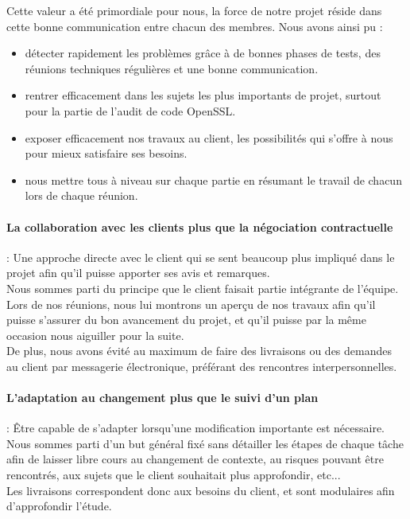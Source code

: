 Cette valeur a été primordiale pour nous, la force de notre projet réside dans cette bonne communication entre chacun des membres. Nous avons ainsi pu :
\begin{itemize}
\item détecter rapidement les problèmes grâce à de bonnes phases de tests, des réunions techniques régulières et une bonne communication.
\item rentrer efficacement dans les sujets les plus importants de projet, surtout pour la partie de l'audit de code OpenSSL.
\item exposer efficacement nos travaux au client, les possibilités qui s'offre à nous pour mieux satisfaire ses besoins.
\item nous mettre tous à niveau sur chaque partie en résumant le travail de chacun lors de chaque réunion.
\end{itemize}

\paragraph{La collaboration avec les clients plus que la négociation contractuelle} : Une approche directe avec le client qui se sent beaucoup plus impliqué dans le projet afin qu'il puisse apporter ses avis et remarques.\\

Nous sommes parti du principe que le client faisait partie intégrante de l'équipe. Lors de nos réunions, nous lui montrons un aperçu de nos travaux afin qu'il puisse s'assurer du bon avancement du projet, et qu'il puisse par la même occasion nous aiguiller pour la suite.\\
De plus, nous avons évité au maximum de faire des livraisons ou des demandes au client par messagerie électronique, préférant des rencontres interpersonnelles.


\paragraph{L'adaptation au changement plus que le suivi d'un plan} :
Être capable de s'adapter lorsqu'une modification importante est nécessaire.\\

Nous sommes parti d'un but général fixé sans détailler les étapes de chaque tâche afin de laisser libre cours au changement de contexte, au risques pouvant être rencontrés, aux sujets que le client souhaitait plus approfondir, etc...\\
Les livraisons correspondent donc aux besoins du client, et sont modulaires afin d'approfondir l'étude.

